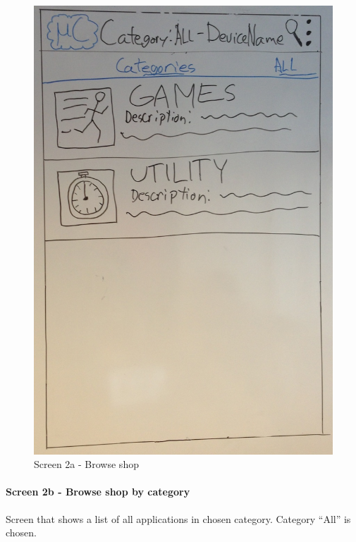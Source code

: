 \begin{figure}[H]
\centering
\includegraphics[scale=0.2]{images/Design_guide/Screen2a.png}
\caption{Screen 2a - Browse shop}
\label{fig:screen2a}
\end{figure}


\paragraph{Screen 2b - Browse shop by category}
Screen that shows a list of all applications in chosen category. Category ``All'' is chosen.

